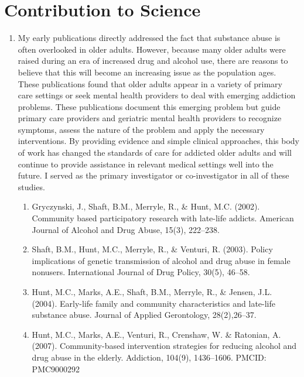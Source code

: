 \documentclass{nihbiosketch}
\begin{document}

\section{Contribution to Science}

\begin{enumerate}

\item My early publications directly addressed the fact that substance abuse is
    often overlooked in older adults. However, because many older adults were
    raised during an era of increased drug and alcohol use, there are reasons
    to believe that this will become an increasing issue as the population
    ages.   These publications found that older adults appear in a variety of
    primary care settings or seek mental health providers to deal with emerging
    addiction problems.  These publications document this emerging problem but
    guide primary care providers and geriatric mental health providers to
    recognize symptoms, assess the nature of the problem and apply the
    necessary interventions.   By providing evidence and simple clinical
    approaches, this body of work has changed the standards of care for
    addicted older adults and will continue to provide assistance in relevant
    medical settings well into the future.  I served as the primary
    investigator or co-investigator in all of these studies. 

\begin{enumerate}

\item Gryczynski, J., Shaft, B.M., Merryle, R., \& Hunt, M.C. (2002). Community
        based participatory research with late-life addicts. American Journal
        of Alcohol and Drug Abuse, 15(3), 222--238.

\item Shaft, B.M., Hunt, M.C., Merryle, R., \& Venturi, R. (2003). Policy
        implications of genetic transmission of alcohol and drug abuse in
        female nonusers. International Journal of Drug Policy, 30(5), 46--58.

\item Hunt, M.C., Marks, A.E., Shaft, B.M., Merryle, R., \& Jensen, J.L.
        (2004). Early-life family and community characteristics and late-life
        substance abuse. Journal of Applied Gerontology, 28(2),26--37.

\item Hunt, M.C., Marks, A.E., Venturi, R., Crenshaw, W. \& Ratonian, A.
        (2007). Community-based intervention strategies for reducing alcohol
        and drug abuse in the elderly.  Addiction, 104(9), 1436--1606. PMCID:
        PMC9000292


\end{enumerate}
\end{enumerate}
\end{document}
